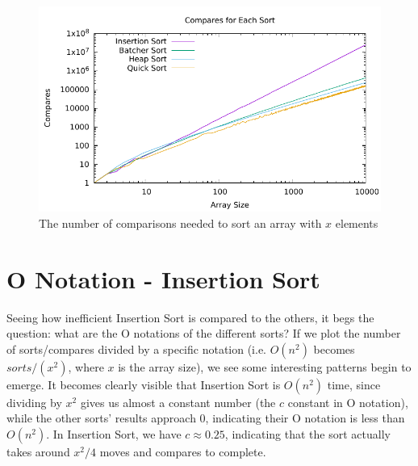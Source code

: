 \documentclass[12pt]{article}
\begin{document}
\begin{figure}[H]\begin{centering}
\includegraphics{plots/compares.pdf}\caption{The number of comparisons needed to sort an array with $x$ elements}
\end{centering}\end{figure}

\section{O Notation - Insertion Sort}
Seeing how inefficient Insertion Sort is compared to the others, it begs the question: what are the O notations of the different sorts? If we plot the number of sorts/compares divided by a specific notation (i.e. $O(n^2)$ becomes $sorts / (x^2)$, where $x$ is the array size), we see some interesting patterns begin to emerge. It becomes clearly visible that Insertion Sort is $O(n^2)$ time, since dividing by $x^2$ gives us almost a constant number (the $c$ constant in O notation), while the other sorts' results approach 0, indicating their O notation is less than $O(n^2)$. In Insertion Sort, we have $c \approx 0.25$, indicating that the sort actually takes around $x^2/4$ moves and compares to complete.
\end{document}
